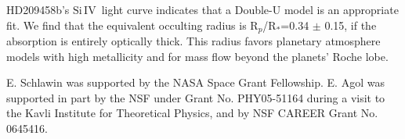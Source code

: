 \documentclass[twocolumn]{emulateapj}
\newcommand{\siIV}{\ensuremath{\mathrm{Si}\,\scriptstyle \mathrm{IV}}}
\newcommand{\p}{R$_p$/R$_*$}
\begin{document}
HD209458b's \siIV\ light curve indicates that a Double-U model is an appropriate fit. We find that the equivalent occulting radius is \p=0.34 $\pm$ 0.15, if the absorption is entirely optically thick. This radius favors planetary atmosphere models with high metallicity and for mass flow beyond the planets' Roche lobe.

E. Schlawin was supported by the NASA Space Grant Fellowship. E. Agol was supported in part by the NSF under Grant No.
PHY05-51164 during a visit to the Kavli Institute for
Theoretical Physics, and by NSF CAREER Grant No. 0645416.
\\

  
\end{document}
